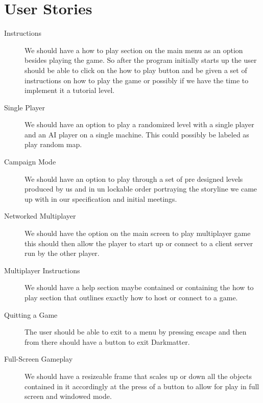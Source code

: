 \chapter{User Stories}
\label{cha:us}


\begin{description}
\item [Instructions] We should have a how to play section on the main
  menu as an option besides playing the game. So after the program
  initially starts up the user should be able to click on the how to
  play button and be given a set of instructions on how to play the
  game or possibly if we have the time to implement it a tutorial
  level.

\item [Single Player] We should have an option to play a randomized
  level with a single player and an AI player on a single
  machine. This could possibly be labeled as play random map.

\item [Campaign Mode] We should have an option to play through a set
  of pre designed levels produced by us and in un lockable order
  portraying the storyline we came up with in our specification and
  initial meetings.

\item [Networked Multiplayer] We should have the option on the main
  screen to play multiplayer game this should then allow the player to
  start up or connect to a client server run by the other player.

\item [Multiplayer Instructions] We should have a help section maybe
  contained or containing the how to play section that outlines
  exactly how to host or connect to a game.

\item [Quitting a Game] The user should be able to exit to a menu by
  pressing escape and then from there should have a button to exit
  Darkmatter.

\item [Full-Screen Gameplay] We should have a resizeable frame that
  scales up or down all the objects contained in it accordingly at the
  press of a button to allow for play in full screen and windowed
  mode.
\end{description}


